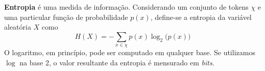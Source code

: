 \documentclass{automatextcc}
\begin{document}



\textbf{Entropia} é uma medida de informação. Considerando um conjunto de tokens $\chi$ e uma particular função de probabilidade $p(x)$, define-se a entropia da variável aleatória $X$ como
\begin{equation}
    \label{entropia}
    H(X) = - \sum_{x \in \chi} p(x) \log_2 \big(p(x)\big) 
\end{equation}
O logaritmo, em princípio, pode ser computado em qualquer base. Se utilizamos $\log$ na base 2, o valor resultante da entropia é mensurado em \textit{bits}. 
\end{document}
